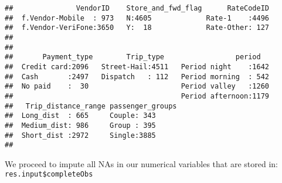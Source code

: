 \documentclass[
  18pt,
  a4paper]{article}
\newenvironment{Shaded}{\begin{snugshade}}{\end{snugshade}}
\newcommand{\CommentTok}[1]{\textcolor[rgb]{0.56,0.35,0.01}{\textit{#1}}}
\newcommand{\NormalTok}[1]{#1}
\newcommand{\OperatorTok}[1]{\textcolor[rgb]{0.81,0.36,0.00}{\textbf{#1}}}
\newcommand{\StringTok}[1]{\textcolor[rgb]{0.31,0.60,0.02}{#1}}
\begin{document}
\begin{verbatim}
##               VendorID    Store_and_fwd_flag      RateCodeID  
##  f.Vendor-Mobile  : 973   N:4605             Rate-1    :4496  
##  f.Vendor-VeriFone:3650   Y:  18             Rate-Other: 127  
##                                                               
##                                                               
##       Payment_type        Trip_type                 period    
##  Credit card:2096   Street-Hail:4511   Period night    :1642  
##  Cash       :2497   Dispatch   : 112   Period morning  : 542  
##  No paid    :  30                      Period valley   :1260  
##                                        Period afternoon:1179  
##   Trip_distance_range passenger_groups
##  Long_dist  : 665     Couple: 343     
##  Medium_dist: 986     Group : 395     
##  Short_dist :2972     Single:3885     
## 
\end{verbatim}

We proceed to impute all NAs in our numerical variables that are stored
in: \texttt{res.input\$completeObs}

\begin{Shaded}
\end{Shaded}
\end{document}
